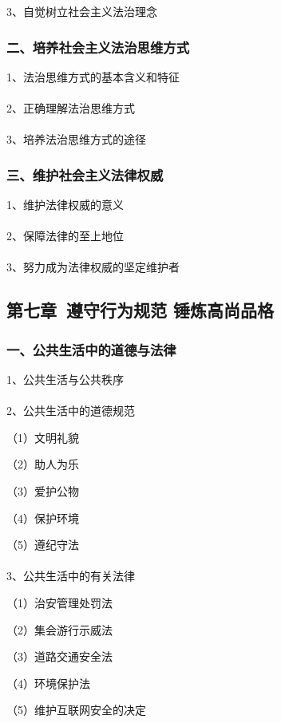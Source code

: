 \documentclass{ctexart}
\begin{document}
3、自觉树立社会主义法治理念


\subsubsection{二、培养社会主义法治思维方式}
1、法治思维方式的基本含义和特征
\\\\

2、正确理解法治思维方式
\\\\

3、培养法治思维方式的途径

\subsubsection{三、维护社会主义法律权威}

1、维护法律权威的意义
\\\\

2、保障法律的至上地位
\\\\

3、努力成为法律权威的坚定维护者

\subsection{第七章\ 遵守行为规范 锤炼高尚品格} 

\subsubsection{一、公共生活中的道德与法律}
1、公共生活与公共秩序
\\\\

2、公共生活中的道德规范

（1）文明礼貌

（2）助人为乐

（3）爱护公物

（4）保护环境

（5）遵纪守法
\\\\

3、公共生活中的有关法律

（1）治安管理处罚法

（2）集会游行示威法

（3）道路交通安全法

（4）环境保护法

（5）维护互联网安全的决定
\end{document}
